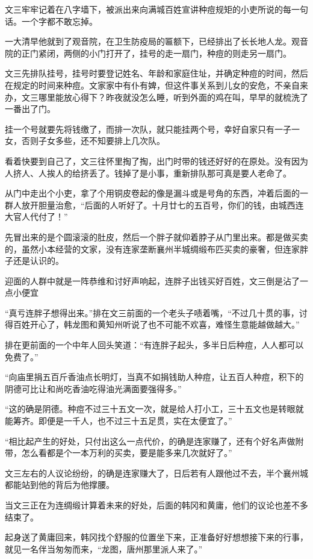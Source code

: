 文三牢牢记着在八字墙下，被派出来向满城百姓宣讲种痘规矩的小吏所说的每一句话。一个字都不敢忘掉。

一大清早他就到了观音院，在卫生防疫局的匾额下，已经排出了长长地人龙。观音院的正门紧闭，两侧的小门打开了，挂号的走一扇门，种痘的则走另一扇门。

文三先排队挂号，挂号时要登记姓名、年龄和家庭住址，并确定种痘的时间，然后在规定的时间来种痘。文家家中有仆有婢，但这件事关系到儿女的安危，不亲自来办，文三哪里能放心得下？昨夜就没怎么睡，听到外面的鸡在叫，早早的就梳洗了一番出了门。

挂一个号就要先将钱缴了，而排一次队，就只能挂两个号，幸好自家只有一子一女，否则子女多些，还不知要排上几次队。

看着快要到自己了，文三往怀里掏了掏，出门时带的钱还好好的在原处。没有因为人挤人、人挨人的给挤丢了。钱掉了是小事，重新排队那可真是要人老命了。

从门中走出个小吏，拿了个用铜皮卷起的像是漏斗或是号角的东西，冲着后面的一群人放开胆量治愈，“后面的人听好了。十月廿七的五百号，你们的钱，由城西连大官人代付了！”

先冒出来的是个圆滚滚的肚皮，然后一个胖子就仰着脖子从门里出来。都是做买卖的，虽然小本经营的文家，没有连家垄断襄州半城绸缎布匹买卖的豪奢，但连家胖子还是认识的。

迎面的人群中就是一阵恭维和讨好声响起，连胖子出钱买好百姓，文三倒是沾了一点小便宜

“真亏连胖子想得出来。”排在文三前面的一个老头子啧着嘴，“不过几十贯的事，讨得百姓开心了，韩龙图和黄知州听说了也不可能不欢喜，难怪生意能越做越大。”

排在更前面的一个中年人回头笑道：“有连胖子起头，多半日后种痘，人人都可以免费了。”

“向庙里捐五百斤香油点长明灯，当真不如捐钱助人种痘，让五百人种痘，积下的阴德可比让和尚吃香油吃得油光满面要强得多。”

“这的确是阴德。种痘不过三十五文一次，就是给人打小工，三十五文也是转眼就能筹齐。即便是一千人，也不过三十五足贯，实在太便宜了。”

“相比起产生的好处，只付出这么一点代价，的确是连家赚了，还有个好名声做附带，怎么看都是个一本万利的买卖，要是能多来几次就好了。”

文三左右的人议论纷纷，的确是连家赚大了，日后若有人跟他过不去，半个襄州城都能站到他的背后为他撑腰。

当文三正在为连绸缎计算着未来的好处，后面的韩冈和黄庸，他们的议论也差不多结束了。

起身送了黄庸回来，韩冈找个舒服的位置坐下来，正准备好好想想接下来的行事，就见一名伴当匆匆而来，“龙图，唐州那里派人来了。”


